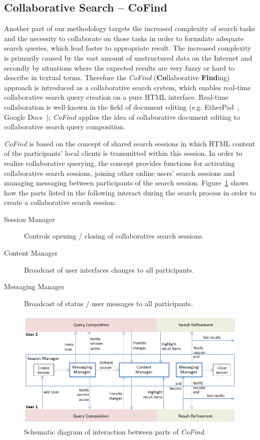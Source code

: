 \documentclass[runningheads,a4paper]{llncs} \usepackage[utf8]{inputenc}
\begin{document}
\subsection{Collaborative Search -- CoFind}
Another part of our methodology targets the increased complexity of search tasks and the necessity to collaborate on those tasks in order to formulate adequate search queries, which lead faster to appropriate result. The increased
complexity is primarily caused by the vast amount of unstructured data on the Internet and secondly by situations where the expected results are very fuzzy or hard to describe in textual terms. Therefore the \emph{CoFind} (\textbf{Co}llaborative \textbf{Find}ing) approach is introduced as a collaborative search system, which enables real-time collaborative search query creation on a pure HTML interface. Real-time collaboration is well-known in the field of document editing (e.g. EtherPad~\cite{etherpad}, Google  Docs~\cite{googledocs}); \emph{CoFind} applies the idea of collaborative document editing to collaborative search query composition.

\emph{CoFind} is based on the concept of shared search sessions in which HTML content of the participants' local clients is transmitted within this session. In order to realize collaborative querying, the concept provides functions for activating collaborative search sessions, joining other online users' search sessions and managing messaging between participants of the search session. Figure~\ref{fig:cofind} shows how the parts listed in the following interact during the search process in order to create a collaborative search session:
\begin{description}
  \item [Session Manager] Controls opening / closing of collaborative search sessions.
  \item [Content Manager] Broadcast of user interfaces changes to all participants.
  \item [Messaging Manager] Broadcast of status / user messages to all participants.
\end{description}

\begin{figure}[h!]
  \centering
    \includegraphics[width=0.75\linewidth]{resources/cofind-workflow.png}
  \caption{Schematic diagram of interaction between parts of \emph{CoFind}.}
  \label{fig:cofind}
\end{figure}
 
\end{document}
